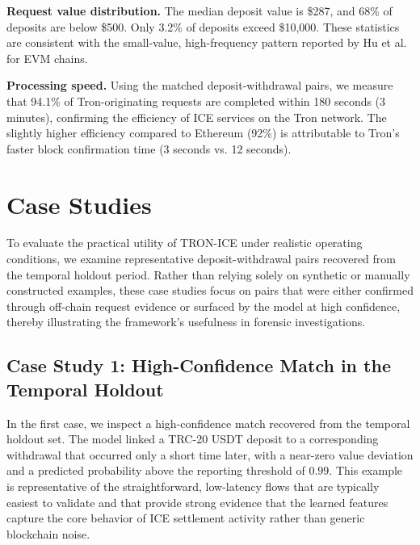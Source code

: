 \documentclass[journal]{IEEEtran}
\begin{document}
    \textbf{Request value distribution.} The median deposit value is \$287, and 68\% of deposits are below \$500. Only 3.2\% of deposits exceed \$10,000. These statistics are consistent with the small-value, high-frequency pattern reported by Hu et al. for EVM chains.
    
    \textbf{Processing speed.} Using the matched deposit-withdrawal pairs, we measure that 94.1\% of Tron-originating requests are completed within 180 seconds (3 minutes), confirming the efficiency of ICE services on the Tron network. The slightly higher efficiency compared to Ethereum (92\%) is attributable to Tron's faster block confirmation time (3 seconds vs. 12 seconds).
    
    
    
    \section{Case Studies}
    \label{sec:case}
    
    To evaluate the practical utility of TRON-ICE under realistic operating conditions, we examine representative deposit-withdrawal pairs recovered from the temporal holdout period. Rather than relying solely on synthetic or manually constructed examples, these case studies focus on pairs that were either confirmed through off-chain request evidence or surfaced by the model at high confidence, thereby illustrating the framework's usefulness in forensic investigations.
    
    \subsection{Case Study 1: High-Confidence Match in the Temporal Holdout}
    \label{subsec:case1}
    In the first case, we inspect a high-confidence match recovered from the temporal holdout set. The model linked a TRC-20 USDT deposit to a corresponding withdrawal that occurred only a short time later, with a near-zero value deviation and a predicted probability above the reporting threshold of $0.99$. This example is representative of the straightforward, low-latency flows that are typically easiest to validate and that provide strong evidence that the learned features capture the core behavior of ICE settlement activity rather than generic blockchain noise.
    
\end{document}
